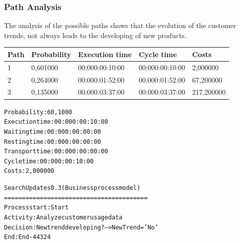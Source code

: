 \subsubsection{Path Analysis}
The analysis of the possible paths shows that the evolution of the customer
trends, not always leads to the developing of new products.

\begin{table}[ht!]
\centering
\begin{tabular}{|l|l|l|l|l|}
\hline
Path&Probability&Execution time&Cycle time&Costs\\
\hline
1&0,601000&00:000:00:10:00&00:000:00:10:00&2,000000\\
\hline
2&0,264000&00:000:01:52:00&00:000:01:52:00&67,200000\\
\hline
3&0,135000&00:000:03:37:00&00:000:03:37:00&217,200000\\
\hline
\end{tabular}
\end{table}

\begin{alltt}
Probability:   60,1000%
Execution time:  00:000:00:10:00
Waiting time:  00:000:00:00:00
Resting time:  00:000:00:00:00
Transport time:  00:000:00:00:00
Cycle time:  00:000:00:10:00
Costs:  2,000000

Search Updates 0.3 (Business process model)
========================================
Process start: Start
Activity: Analyze customer usage data
Decision: New trend developing? --> NewTrend = 'No'
End: End-44324
\end{alltt}


